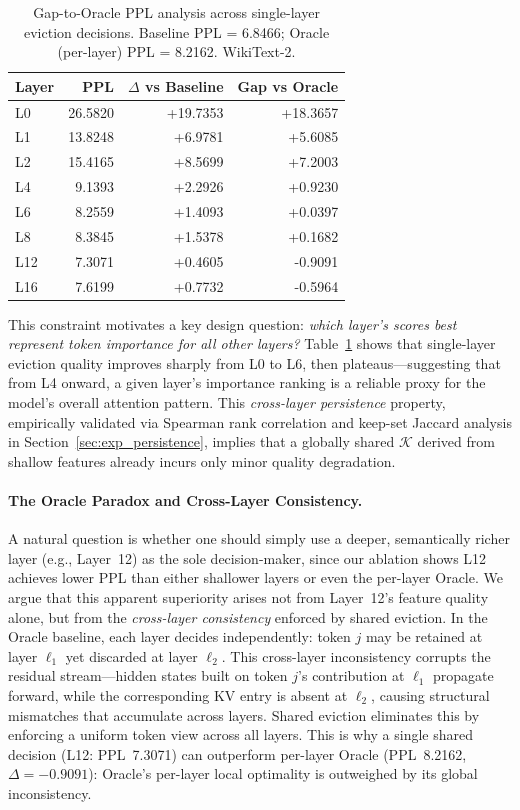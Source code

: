 \documentclass[letterpaper]{article} %
\begin{document}
\begin{table}[t]
\centering
\small
\caption{Gap-to-Oracle PPL analysis across single-layer eviction decisions.
Baseline PPL = 6.8466; Oracle (per-layer) PPL = 8.2162. WikiText-2.}
\label{tab:gap_vs_oracle}
\begin{tabular}{lrrr}
\toprule
Layer & PPL & $\Delta$ vs Baseline & Gap vs Oracle \\
\midrule
L0  & 26.5820 & +19.7353 & +18.3657 \\
L1  & 13.8248 & +6.9781  & +5.6085  \\
L2  & 15.4165 & +8.5699  & +7.2003  \\
L4  & 9.1393  & +2.2926  & +0.9230  \\
L6  & 8.2559  & +1.4093  & +0.0397  \\
L8  & 8.3845  & +1.5378  & +0.1682  \\
L12 & 7.3071  & +0.4605  & -0.9091  \\
L16 & 7.6199  & +0.7732  & -0.5964  \\
\bottomrule
\end{tabular}
\end{table}

This constraint motivates a key design question: \emph{which layer's scores
best represent token importance for all other layers?}
Table~\ref{tab:gap_vs_oracle} shows that single-layer eviction quality
improves sharply from L0 to L6, then plateaus---suggesting that from L4
onward, a given layer's importance ranking is a reliable proxy for the model's
overall attention pattern.
This \emph{cross-layer persistence} property, empirically validated via
Spearman rank correlation and keep-set Jaccard analysis in
Section~\ref{sec:exp_persistence}, implies that a globally shared
$\mathcal{K}$ derived from shallow features already incurs only minor
quality degradation.





\paragraph{The Oracle Paradox and Cross-Layer Consistency.}
A natural question is whether one should simply use a deeper, semantically
richer layer (e.g., Layer~12) as the sole decision-maker, since our ablation
shows L12 achieves lower PPL than either shallower layers or even the per-layer
Oracle. We argue that this apparent superiority arises not from Layer~12's
feature quality alone, but from the \emph{cross-layer consistency} enforced by
shared eviction. In the Oracle baseline, each layer decides independently:
token $j$ may be retained at layer $\ell_1$ yet discarded at layer $\ell_2$.
This cross-layer inconsistency corrupts the residual stream---hidden states
built on token $j$'s contribution at $\ell_1$ propagate forward, while the
corresponding KV entry is absent at $\ell_2$, causing structural mismatches
that accumulate across layers. Shared eviction eliminates this by enforcing a
uniform token view across all layers. This is why a single shared decision
(L12: PPL~7.3071) can outperform per-layer Oracle (PPL~8.2162,
$\Delta = -0.9091$): Oracle's per-layer local optimality is outweighed by its
global inconsistency.
\end{document}
